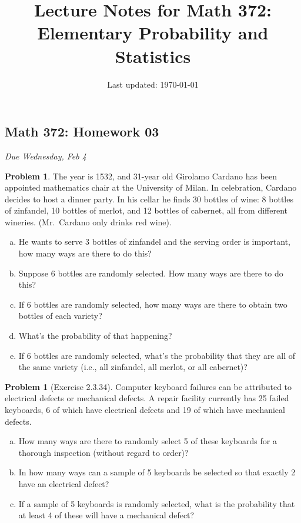 \documentclass[10pt]{article}
\title{Lecture Notes for Math 372: \\Elementary Probability and Statistics}
\date{Last updated: \today}
\theoremstyle{definition}
\newtheorem{problem}[theorem]{Problem}
\newcommand{\1}[1]{\textbf{1}_{\left[#1\right]}} %
\begin{document}
\begin{center}
  \section*{Math 372: Homework 03}
  \textit{Due Wednesday, Feb 4}
\end{center}

\begin{problem}
  The year is 1532, and 31-year old Girolamo Cardano has been appointed mathematics chair at the
  University of Milan. In celebration, Cardano decides to host a dinner party. In his cellar he finds
  30 bottles of wine: 8 bottles of zinfandel, 10 bottles of merlot, and 12 bottles of cabernet, all
  from different wineries. (Mr.~Cardano only drinks red wine).
  \begin{enumerate}[(a),itemsep=0em]
    \item He wants to serve 3 bottles of zinfandel and the serving order is important, how many ways are
    there to do this?
    \item Suppose 6 bottles are randomly selected. How many ways are there to do this?
    \item If 6 bottles are randomly selected, how many ways are there to obtain two bottles of each
    variety?
    \item What's the probability of that happening?
    \item If 6 bottles are randomly selected, what's the probability that they are all of the same
    variety (i.e., all zinfandel, all merlot, or all cabernet)?
  \end{enumerate}
\end{problem}




\begin{problem}[Exercise 2.3.34]
  Computer keyboard failures can be attributed to electrical defects or
  mechanical defects. A repair facility currently has 25 failed keyboards, 6
  of which have electrical defects and 19 of which have mechanical defects.
  \begin{enumerate}[(a),itemsep=0em]
    \item How many ways are there to randomly select 5 of these keyboards for
    a thorough inspection (without regard to order)?
    \item In how many ways can a sample of 5 keyboards be selected so that
    exactly 2 have an electrical defect?
    \item If a sample of 5 keyboards is randomly selected, what is the
    probability that at least 4 of these will have a mechanical defect?
  \end{enumerate}
\end{problem}
\end{document}
